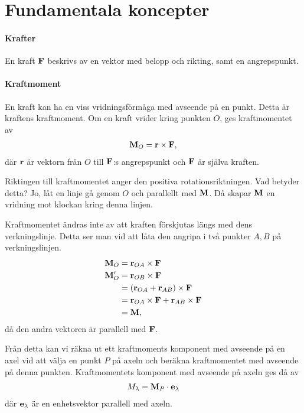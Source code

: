 \section{Fundamentala koncepter}

\paragraph{Krafter}
En kraft $\vect{F}$ beskrivs av en vektor med belopp och rikting, samt en angrepspunkt.

\paragraph{Kraftmoment}
En kraft kan ha en viss vridningsförmåga med avseende på en punkt. Detta är kraftens kraftmoment. Om en kraft vrider kring punkten $O$, ges kraftmomentet av
\begin{align*}
	\vect{M}_O = \vect{r}\times\vect{F},
\end{align*}
där $\vect{r}$ är vektorn från $O$ till $\vect{F}$:s angrepspunkt och $\vect{F}$ är själva kraften.

Riktingen till kraftmomentet anger den positiva rotationsriktningen. Vad betyder detta? Jo, låt en linje gå genom $O$ och parallellt med $\vect{M}$. Då skapar $\vect{M}$ en vridning mot klockan kring denna linjen.

Kraftmomentet ändras inte av att kraften förskjutas längs med dens verkningslinje. Detta ser man vid att låta den angripa i två punkter $A, B$ på verkningslinjen.
\begin{align*}
	\vect{M}_O  &= \vect{r}_{OA}\times\vect{F} \\
	\vect{M}'_O &= \vect{r}_{OB}\times\vect{F} \\
	            &= (\vect{r}_{OA} + \vect{r}_{AB})\times\vect{F} \\
	            &= \vect{r}_{OA}\times\vect{F} + \vect{r}_{AB}\times\vect{F}\\
	            &= \vect{M},
\end{align*}
då den andra vektoren är parallell med $\vect{F}$.

Från detta kan vi räkna ut ett kraftmoments komponent med avseende på en axel vid att välja en punkt $P$ på axeln och beräkna kraftmomentet med avseende på denna punkten. Kraftmomentets komponent med avseende på axeln ges då av
\begin{align*}
	M_\lambda = \vect{M}_P\cdot\vect{e}_\lambda
\end{align*}
där $\vect{e}_\lambda$ är en enhetsvektor parallell med axeln.

